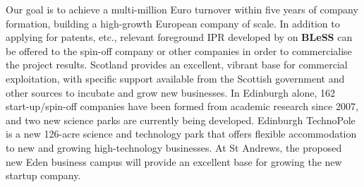 \documentclass[a4paper,11pt]{article}
\newcommand{\project}[1]{\textbf{#1}\xspace}
\newcommand{\BLESS}{\project{BLeSS}}
\newcommand{\TheProject}{\BLESS}
\begin{document}
Our goal is to achieve a multi-million Euro turnover within five years of company formation, building a
high-growth European company of scale.
In addition to applying for patents, etc., relevant foreground IPR developed by \SAshort{} on \TheProject{} can be offered to the spin-off company
or other companies in order to commercialise the project results.
Scotland
provides an excellent, vibrant base for commercial exploitation, with
specific support available from the Scottish government and other
sources to incubate and grow new
businesses. %
In Edinburgh
alone, %
162 start-up/spin-off companies have been formed from academic
research since 2007, and two new science parks are currently being
developed.  Edinburgh TechnoPole is a new 126-acre science and
technology park that offers flexible accommodation to new and growing
high-technology businesses.  At St Andrews, the proposed new Eden business
campus will provide an excellent base for growing the new startup company.
\end{document}
